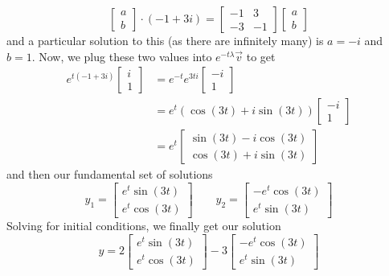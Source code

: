 \documentclass[12pt]{article}
\begin{document}
\begin{enumerate}
          \[\begin{bmatrix}a \\ b\end{bmatrix} \cdot (-1+3i)=\begin{bmatrix}-1 & 3 \\ -3 & -1\end{bmatrix}\begin{bmatrix}a \\ b\end{bmatrix}\]
          and a particular solution to this (as there are infinitely many) is $a=-i$ and $b=1$.
          Now, we plug these two values into $e^{-t\lambda}\vec{v}$ to get
          \begin{align*}
              e^{t(-1+3i)} \begin{bmatrix}i \\ 1\end{bmatrix} & = e^{-t} e^{3ti} \begin{bmatrix}-i \\ 1\end{bmatrix}                \\
                                                              & = e^t (\cos (3t) + i \sin (3t)) \begin{bmatrix}-i \\ 1\end{bmatrix} \\
                                                              & = e^t \begin{bmatrix}
                                                                          \sin (3t)-i \cos (3t) \\
                                                                          \cos (3t)+i \sin (3t)
                                                                      \end{bmatrix}
          \end{align*}
          and then our fundamental set of solutions
          \[y_1=\begin{bmatrix}
                  e^t \sin(3t) \\
                  e^t \cos(3t)
              \end{bmatrix} \qquad y_2=\begin{bmatrix}
                  -e^t \cos (3t) \\
                  e^t \sin (3t)
              \end{bmatrix}\]
          Solving for initial conditions, we finally get our solution
          \[y=2\begin{bmatrix}
                  e^t \sin(3t) \\
                  e^t \cos(3t)
              \end{bmatrix}-3\begin{bmatrix}
                  -e^t \cos (3t) \\
                  e^t \sin (3t)
              \end{bmatrix}\]


\end{enumerate}
\end{document}
